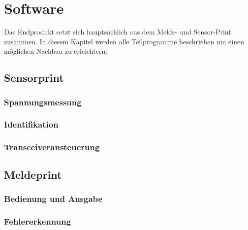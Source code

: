 \section{Software}
Das Endprodukt setzt sich hauptsächlich aus dem Melde- und Sensor-Print zusammen. In diesem
Kapitel werden alle Teilprogramme beschrieben um einen möglichen Nachbau zu erleichtern.
\subsection{Sensorprint}
\subsubsection{Spannungsmessung}
\subsubsection{Identifikation}
\subsubsection{Transceiveransteuerung}
\subsection{Meldeprint}
\subsubsection{Bedienung und Ausgabe}
\subsubsection{Fehlererkennung}